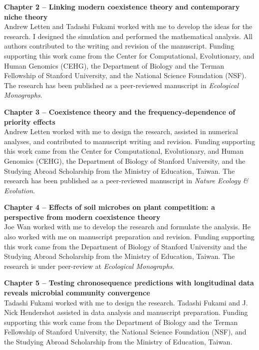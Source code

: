 \noindent \textbf{Chapter 2 -- Linking modern coexistence theory and contemporary niche theory}\\
\noindent Andrew Letten and Tadashi Fukami worked with me to develop the ideas for the research. I designed the simulation and performed the mathematical analysis. All authors contributed to the writing and revision of the manuscript. Funding supporting this work came from the Center for Computational, Evolutionary, and Human Genomics (CEHG), the Department of Biology and the Terman Fellowship of Stanford University, and the National Science Foundation (NSF). The research has been published as a peer-reviewed manuscript in \textit{Ecological Monographs}.
\bigskip


\noindent \textbf{Chapter 3 -- Coexistence theory and the frequency-dependence of priority effects}\\
\noindent Andrew Letten worked with me to design the research, assisted in numerical analyses, and contributed to manuscript writing and revision. Funding supporting this work came from the Center for Computational, Evolutionary, and Human Genomics (CEHG), the Department of Biology of Stanford University, and the Studying Abroad Scholarship from the Ministry of Education, Taiwan. The research has been published as a peer-reviewed manuscript in \textit{Nature Ecology \& Evolution}.
\bigskip


\noindent \textbf{Chapter 4 -- Effects of soil microbes on plant competition: a perspective from modern coexistence theory}\\
\noindent Joe Wan worked with me to develop the research and formulate the analysis. He also worked with me on manuscript preparation and revision. Funding supporting this work came from the Department of Biology of Stanford University and the Studying Abroad Scholarship from the Ministry of Education, Taiwan. The research is under peer-review at \textit{Ecological Monographs}.
\bigskip


\noindent \textbf{Chapter 5 -- Testing chronosequence predictions with longitudinal data reveals microbial community convergence}\\
\noindent Tadashi Fukami worked with me to design the research. Tadashi Fukami and J. Nick Hendershot assisted in data analysis and manuscript preparation. Funding supporting this work came from the Department of Biology and the Terman Fellowship of Stanford University, the National Science Foundation (NSF), and the Studying Abroad Scholarship from the Ministry of Education, Taiwan.
\bigskip



